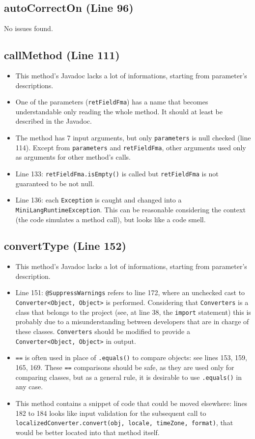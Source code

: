 \documentclass[11pt]{article} %
\begin{document}
\subsection{autoCorrectOn (Line 96)}
No issues found.

\subsection{callMethod (Line 111)}
\begin{itemize}
	\item This method's Javadoc lacks a lot of informations, starting from parameter's descriptions.
	\item One of the parameters (\texttt{retFieldFma}) has a name that becomes understandable only reading the whole method. It should at least be described in the Javadoc.
	\item The method has 7 input arguments, but only \texttt{parameters} is null checked (line 114). Except from \texttt{parameters} and \texttt{retFieldFma}, other arguments used only as arguments for other method's calls. 
	\item Line 133: \texttt{retFieldFma.isEmpty()} is called but \texttt{retFieldFma} is not guaranteed to be not null. 
	\item Line 136: each \texttt{Exception} is caught and changed into a \texttt{MiniLangRuntimeException}. This can be reasonable considering the context (the code simulates a method call), but looks like a code smell.
\end{itemize}

\subsection{convertType (Line 152)}
\begin{itemize}
	\item This method's Javadoc lacks a lot of informations, starting from parameter's description.
	\item Line 151: \texttt{@SuppressWarnings} refers to line 172, where an unchecked cast to \texttt{Converter<Object, Object>} is performed. Considering that \texttt{Converters} is a class that belongs to the project (see, at line 38, the \texttt{import} statement) this is probably due to a misunderstanding between developers that are in charge of these classes. \texttt{Converters} should be modified to provide a \texttt{Converter<Object, Object>} in output.
	\item \texttt{==} is often used in place of \texttt{.equals()} to compare objects: see lines 153, 159, 165, 169. These \texttt{==} comparisons should be safe, as they are used only for comparing classes, but as a general rule, it is desirable to use \texttt{.equals()} in any case.
	\item This method contains a snippet of code that could be moved elsewhere: lines 182 to 184 looks like input validation for the subsequent call to \texttt{localizedConverter.convert(obj, locale, timeZone, format)}, that would be better located into that method itself.
\end{itemize}
\end{document}
